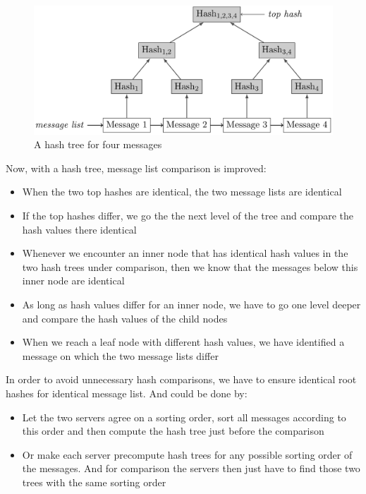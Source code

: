 \begin{figure}[!h]
        \centering
        \includegraphics[width=0.85\linewidth]{images/AdvancedDataManagment/distributed_databases/hash_tree.jpeg}
        \caption{A hash tree for four messages}
    \end{figure}
Now, with a hash tree, message list comparison is improved:
\begin{itemize}
    \item When the two top hashes are identical, the two message lists are identical
    \item If the top hashes differ, we go the the next level of the tree and compare the hash values there identical
    \item Whenever we encounter an inner node that has identical hash values in the two hash trees under comparison, then we know that the messages below this inner node are identical
    \item As long as hash values differ for an inner node, we have to go one level deeper and compare the hash values of the child nodes
    \item When we reach a leaf node with different hash values, we have identified a message on which the two message lists differ
\end{itemize}
\newpage
In order to avoid unnecessary hash comparisons, we have to ensure identical root hashes for identical message list. And could be done by:
\begin{itemize}
    \item Let the two servers agree on a sorting order, sort all messages according to this order and then compute the hash tree just before the comparison
    \item Or make each server precompute hash trees for any possible sorting order of the messages. And for comparison the servers then just have to find those two trees with the same sorting order
\end{itemize}